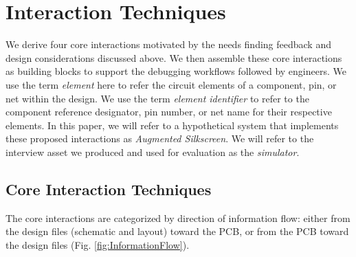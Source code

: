 \documentclass [11pt, proquest] {uwthesis}[2020/02/24]
\newcommand{\ASname}{Augmented Silkscreen}
\begin{document}
\newcommand{\ElemLocOnPCB}{ElemLocOnPCB}%
\newcommand{\MetaDataOnPCB}{MetadataOnPCB}%
\newcommand{\ElemIdOnDesFiles}{ElemIDOnDF}%
\newcommand{\MeasOnDesFiles}{MeasOnDF}%

\section{Interaction Techniques}
\label{sec:interactions}

We derive four core interactions motivated by the needs finding feedback and design considerations discussed above. We then assemble these core interactions as building blocks to support the debugging workflows followed by engineers. We use the term \textit{element} here to refer the circuit elements of a component, pin, or net within the design. We use the term \textit{element identifier} to refer to the component reference designator, pin number, or net name for their respective elements.
In this paper, we will refer to a hypothetical system
that implements these proposed interactions as \textit{\ASname}. We will refer to the interview asset we produced and used for evaluation as the \textit{simulator}.

\subsection{Core Interaction Techniques}
The core interactions are categorized by direction of information flow: either from the design files (schematic and layout) toward the PCB, or from the PCB toward the design files (Fig. \ref{fig:InformationFlow}).
\end{document}
